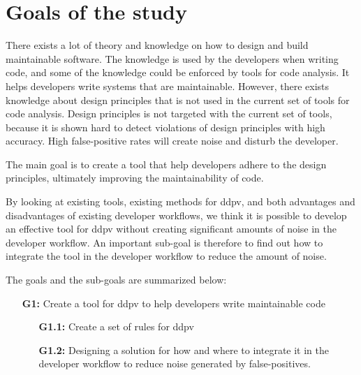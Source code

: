 \documentclass{report}
\begin{document}
\section{Goals of the study}

There exists a lot of theory and knowledge on how to design and build maintainable software. The knowledge is used by the developers when writing code, and some of the knowledge could be enforced by tools for code analysis. It helps developers write systems that are maintainable. However, there exists knowledge about design principles that is not used in the current set of tools for code analysis. Design principles is not targeted with the current set of tools, because it is shown hard to detect violations of design principles with high accuracy. High false-positive rates will create noise and disturb the developer.

The main goal is to create a tool that help developers adhere to the design principles, ultimately improving the maintainability of code.

By looking at existing tools, existing methods for \gls{ddpv}, and both advantages and disadvantages of existing developer workflows, we think it is possible to develop an effective tool for \gls{ddpv} without creating significant amounts of noise in the developer workflow. An important sub-goal is therefore to find out how to integrate the tool in the developer workflow to reduce the amount of noise. 

The goals and the sub-goals are summarized below:

\begin{enumerate}
    \item [\textbf{G1:}] Create a tool for \gls{ddpv} to help developers write maintainable code
    \begin{enumerate}
        \item [\textbf{G1.1:}] Create a set of rules for \gls{ddpv}
        \item [\textbf{G1.2:}]Designing a solution for how and where to integrate it in the developer workflow to reduce noise generated by false-positives.
    \end{enumerate}
\end{enumerate}
\end{document}
